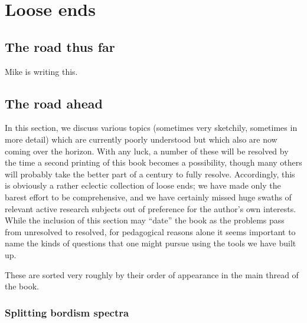 
\chapter{Loose ends}








\section{The road thus far}

\begin{center}
\Huge Mike is writing this.
\end{center}






\section{The road ahead}\label{OpenQuestionsSection}



In this section, we discuss various topics (sometimes very sketchily, sometimes in more detail) which are currently poorly understood but which also are now coming over the horizon.  With any luck, a number of these will be resolved by the time a second printing of this book becomes a possibility, though many others will probably take the better part of a century to fully resolve.  Accordingly, this is obviously a rather eclectic collection of loose ends; we have made only the barest effort to be comprehensive, and we have certainly missed huge swaths of relevant active research subjects out of preference for the author's own interests.  While the inclusion of this section may ``date'' the book as the problems pass from unresolved to resolved, for pedagogical reasons alone it seems important to name the kinds of questions that one might pursue using the tools we have built up.

These are sorted very roughly by their order of appearance in the main thread of the book.








\subsection*{Splitting bordism spectra}

